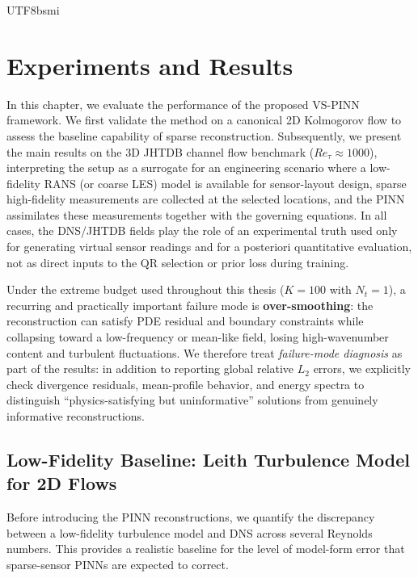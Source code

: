 \documentclass[master]{NTHUthesis}
\begin{document}
\begin{CJK*}{UTF8}{bsmi}
\chapter{Experiments and Results}
\label{ch:experiments}

In this chapter, we evaluate the performance of the proposed VS-PINN framework. 
We first validate the method on a canonical 2D Kolmogorov flow to assess the baseline capability of sparse reconstruction. 
Subsequently, we present the main results on the 3D JHTDB channel flow benchmark ($Re_\tau \approx 1000$), interpreting the setup as a surrogate for an engineering scenario where a low-fidelity RANS (or coarse LES) model is available for sensor-layout design, sparse high-fidelity measurements are collected at the selected locations, and the PINN assimilates these measurements together with the governing equations. In all cases, the DNS/JHTDB fields play the role of an experimental truth used only for generating virtual sensor readings and for a posteriori quantitative evaluation, not as direct inputs to the QR selection or prior loss during training.

Under the extreme budget used throughout this thesis ($K=100$ with $N_t=1$), a recurring and practically important failure mode is \textbf{over-smoothing}: the reconstruction can satisfy PDE residual and boundary constraints while collapsing toward a low-frequency or mean-like field, losing high-wavenumber content and turbulent fluctuations. We therefore treat \emph{failure-mode diagnosis} as part of the results: in addition to reporting global relative $L_2$ errors, we explicitly check divergence residuals, mean-profile behavior, and energy spectra to distinguish ``physics-satisfying but uninformative'' solutions from genuinely informative reconstructions.

\section{Low-Fidelity Baseline: Leith Turbulence Model for 2D Flows}
Before introducing the PINN reconstructions, we quantify the discrepancy between a low-fidelity turbulence model and DNS across several Reynolds numbers. This provides a realistic baseline for the level of model-form error that sparse-sensor PINNs are expected to correct.


\end{CJK*}
\end{document}

